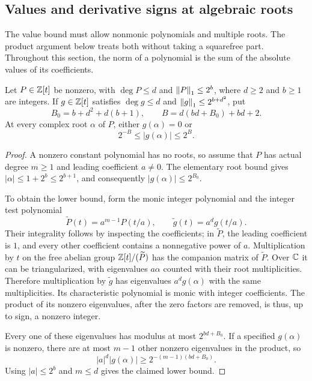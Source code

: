 \subsection{Values and derivative signs at algebraic roots}

The value bound must allow nonmonic polynomials and multiple roots.
The product argument below treats both without taking a squarefree part.
Throughout this section, the norm of a polynomial is the sum of the
absolute values of its coefficients.

\begin{lemma}\label{lem:root-value-bounds}
Let $P\in\mathbb Z[t]$ be nonzero, with $\deg P\le d$ and
$\left\lVert P\right\rVert_1\le2^b$, where $d\ge2$ and $b\ge1$ are integers.  If
$g\in\mathbb Z[t]$ satisfies $\deg g\le d$ and
$\left\lVert g\right\rVert_1\le2^{b+d^2}$, put
\[
 B_0=b+d^2+d(b+1),\qquad
 B=d(bd+B_0)+bd+2.
\]
At every complex root $\alpha$ of $P$, either $g(\alpha)=0$ or
\[
                    2^{-B}\le |g(\alpha)|\le2^B.
\]
\end{lemma}

\begin{proof}
A nonzero constant polynomial has no roots, so assume that $P$ has actual
degree $m\ge1$ and leading coefficient $a\ne0$.  The elementary root
bound gives $|\alpha|\le1+2^b\le2^{b+1}$, and consequently
$|g(\alpha)|\le2^{B_0}$.

To obtain the lower bound, form the monic integer polynomial and the
integer test polynomial
\[
 \widetilde P(t)=a^{m-1}P(t/a),\qquad
 \widetilde g(t)=a^d g(t/a).
\]
Their integrality follows by inspecting the coefficients; in
$\widetilde P$, the leading coefficient is $1$, and every other
coefficient contains a nonnegative power of $a$.
Multiplication by $t$ on the free abelian group
$\mathbb Z[t]/(\widetilde P)$ has the companion matrix of $\widetilde P$.
Over $\mathbb C$ it can be triangularized, with eigenvalues $a\alpha$ counted
with their root multiplicities.  Therefore multiplication by
$\widetilde g$ has eigenvalues $a^d g(\alpha)$ with the same
multiplicities.  Its characteristic polynomial is monic with integer
coefficients.  The product of its nonzero eigenvalues, after the zero
factors are removed, is thus, up to sign, a nonzero integer.

Every one of these eigenvalues has modulus at most $2^{bd+B_0}$.
If a specified $g(\alpha)$ is nonzero, there are at most $m-1$ other
nonzero eigenvalues in the product, so
\[
 |a|^d|g(\alpha)|\ge2^{-(m-1)(bd+B_0)}.
\]
Using $|a|\le2^b$ and $m\le d$ gives the claimed lower bound.
\end{proof}

